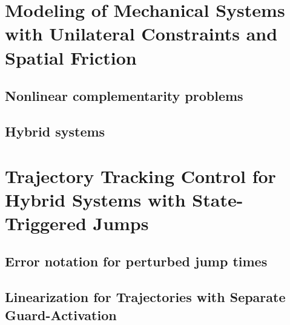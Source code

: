 \documentclass[DC2017114Bouma.tex]{subfiles}
\begin{document}
\graphicspath{{../02_Material/img/}}
\cleartooddpage
\chapter{Modeling of Mechanical Systems with Unilateral Constraints and Spatial Friction}
\section{Nonlinear complementarity problems}
\section{Hybrid systems}

\cleartooddpage
\chapter{Trajectory Tracking Control for Hybrid Systems with State-Triggered Jumps}
\cite{Rijnen2017}
\section{Error notation for perturbed jump times}
\section{Linearization for Trajectories with Separate Guard-Activation}
\end{document}
